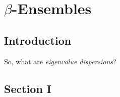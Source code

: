 
\chapter{$\beta$-Ensembles}

\section{Introduction}
So, what are \textit{eigenvalue dispersions}? 


\section{Section I}


